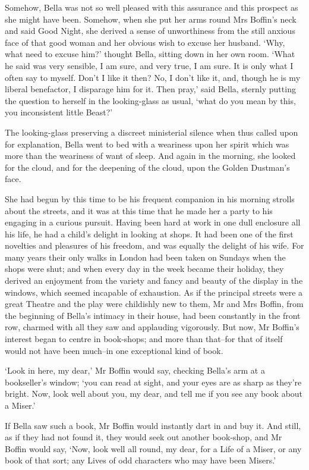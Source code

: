 Somehow, Bella was not so well pleased with this assurance and this
prospect as she might have been. Somehow, when she put her arms
round Mrs Boffin’s neck and said Good Night, she derived a sense of
unworthiness from the still anxious face of that good woman and her
obvious wish to excuse her husband. ‘Why, what need to excuse him?’
thought Bella, sitting down in her own room. ‘What he said was very
sensible, I am sure, and very true, I am sure. It is only what I often
say to myself. Don’t I like it then? No, I don’t like it, and, though
he is my liberal benefactor, I disparage him for it. Then pray,’ said
Bella, sternly putting the question to herself in the looking-glass as
usual, ‘what do you mean by this, you inconsistent little Beast?’

The looking-glass preserving a discreet ministerial silence when thus
called upon for explanation, Bella went to bed with a weariness upon her
spirit which was more than the weariness of want of sleep. And again
in the morning, she looked for the cloud, and for the deepening of the
cloud, upon the Golden Dustman’s face.

She had begun by this time to be his frequent companion in his morning
strolls about the streets, and it was at this time that he made her a
party to his engaging in a curious pursuit. Having been hard at work in
one dull enclosure all his life, he had a child’s delight in looking
at shops. It had been one of the first novelties and pleasures of his
freedom, and was equally the delight of his wife. For many years their
only walks in London had been taken on Sundays when the shops were shut;
and when every day in the week became their holiday, they derived an
enjoyment from the variety and fancy and beauty of the display in the
windows, which seemed incapable of exhaustion. As if the principal
streets were a great Theatre and the play were childishly new to them,
Mr and Mrs Boffin, from the beginning of Bella’s intimacy in their
house, had been constantly in the front row, charmed with all they saw
and applauding vigorously. But now, Mr Boffin’s interest began to centre
in book-shops; and more than that--for that of itself would not have
been much--in one exceptional kind of book.

‘Look in here, my dear,’ Mr Boffin would say, checking Bella’s arm at a
bookseller’s window; ‘you can read at sight, and your eyes are as sharp
as they’re bright. Now, look well about you, my dear, and tell me if you
see any book about a Miser.’

If Bella saw such a book, Mr Boffin would instantly dart in and buy
it. And still, as if they had not found it, they would seek out another
book-shop, and Mr Boffin would say, ‘Now, look well all round, my
dear, for a Life of a Miser, or any book of that sort; any Lives of odd
characters who may have been Misers.’

